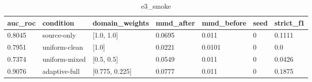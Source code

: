 \begin{table}[h]
\centering
\caption{e3_smoke}
\label{tab:e3_smoke}
\begin{tabular}{lllllll}
\toprule
auc\_roc & condition & domain\_weights & mmd\_after & mmd\_before & seed & strict\_f1 \\
\midrule
0.8045 & source-only & [1.0, 1.0] & 0.0695 & 0.011 & 0 & 0.1111 \\
0.7951 & uniform-clean & [1.0] & 0.0221 & 0.0101 & 0 & 0.0 \\
0.7374 & uniform-mixed & [0.5, 0.5] & 0.0549 & 0.011 & 0 & 0.0426 \\
0.9076 & adaptive-full & [0.775, 0.225] & 0.0777 & 0.011 & 0 & 0.1875 \\
\bottomrule
\end{tabular}
\end{table}
